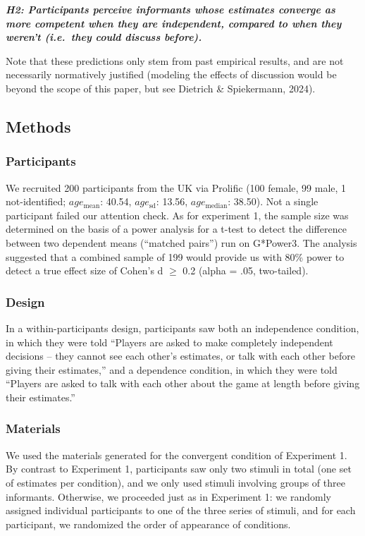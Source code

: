 \documentclass[
  doc,floatsintext]{apa6}
\begin{document}
\textbf{\emph{H2: Participants perceive informants whose estimates converge as more competent when they are independent, compared to when they weren't (i.e.~they could discuss before).}}

Note that these predictions only stem from past empirical results, and are not necessarily normatively justified (modeling the effects of discussion would be beyond the scope of this paper, but see Dietrich \& Spiekermann, 2024).

\subsection{Methods}\label{methods-1}

\subsubsection{Participants}\label{participants-1}

We recruited 200 participants from the UK via Prolific (100 female, 99 male, 1 not-identified; \(age_\text{mean}\): 40.54, \(age_\text{sd}\): 13.56, \(age_\text{median}\): 38.50). Not a single participant failed our attention check. As for experiment 1, the sample size was determined on the basis of a power analysis for a t-test to detect the difference between two dependent means (``matched pairs'') run on G*Power3. The analysis suggested that a combined sample of 199 would provide us with 80\% power to detect a true effect size of Cohen's d \(\geq\) 0.2 (alpha = .05, two-tailed).

\subsubsection{Design}\label{design-1}

In a within-participants design, participants saw both an independence condition, in which they were told ``Players are asked to make completely independent decisions -- they cannot see each other's estimates, or talk with each other before giving their estimates,'' and a dependence condition, in which they were told ``Players are asked to talk with each other about the game at length before giving their estimates.''

\subsubsection{Materials}\label{materials-1}

We used the materials generated for the convergent condition of Experiment 1. By contrast to Experiment 1, participants saw only two stimuli in total (one set of estimates per condition), and we only used stimuli involving groups of three informants. Otherwise, we proceeded just as in Experiment 1: we randomly assigned individual participants to one of the three series of stimuli, and for each participant, we randomized the order of appearance of conditions.
\end{document}

